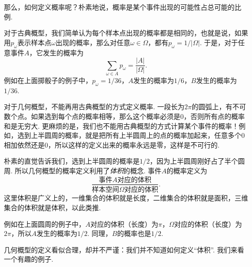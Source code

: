 那么，如何定义概率呢？朴素地说，概率是某个事件出现的可能性占总可能的比例. 

对于古典概型，我们简单认为每个样本点出现的概率都是相同的，也就是说，如果用$p_\omega$表示样本点$\omega$出现的概率，那么对任意$\omega\in\Omega$，都有$p_\omega = 1/|\Omega|$. 于是，对于任意事件$A$，它发生的概率为
\[
    \sum_{\omega\in A} p_\omega = \frac{|A|}{|\Omega|}.
\]
例如在上面掷骰子的例子中，$p_\omega=1/36$，$A$发生的概率为$1/6$，$B$发生的概率为$1/36$.

对于几何概型，不能再用古典概型的方式定义概率. 一段长为$2\pi$的圆弧上，有不可数个点。如果选到每个点的概率相等，那么这个概率必须是$0$，否则所有点的概率和是无穷大. 更麻烦的是，我们也不能用古典概型的方式计算某个事件的概率！例如，选到上半圆周的概率，就是把所有上半圆周上的点的概率加起来，任意多个$0$相加依然还是$0$，所以这样的定义出来的概率永远是零，这样是不可行的. 

朴素的直觉告诉我们，选到上半圆周的概率是$1/2$，因为上半圆周刚好占了半个圆周. 所以几何概型的概率定义利用了\emph{体积}的概念. 事件$A$的概率定义为
\[
    \frac{\text{事件$A$对应的体积}}{\text{样本空间$\Omega$对应的体积}}.
\]
这里体积是广义上的，一维集合的体积就是长度，二维集合的体积就是面积，三维集合的体积就是体积，以此类推. 

例如在上面圆周的例子中，$A$对应的体积（长度）为$\pi$，$\Omega$对应的体积（长度）为$2\pi$，所以$A$发生的概率为$1/2$. 同理，$B$的概率也是$1/2$.

几何概型的定义看似合理，却并不严谨：我们并不知道如何定义“体积”. 我们来看一个有趣的例子. 

